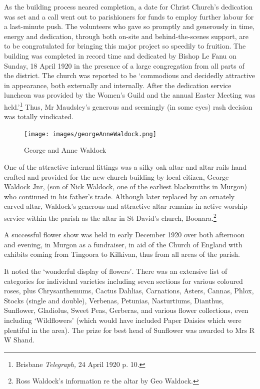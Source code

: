 As the building process neared completion, a date for Christ Church's
dedication was set and a call went out to parishioners for funds to
employ further labour for a last-minute push. The volunteers who gave so
promptly and generously in time, energy and dedication, through both
on-site and behind-the-scenes support, are to be congratulated for
bringing this major project so speedily to fruition. The building was
completed in record time and dedicated by Bishop Le Fanu on Sunday, 18
April 1920 in the presence of a large congregation from all parts of the
district. The church was reported to be `commodious and decidedly
attractive in appearance, both externally and internally. After the
dedication service luncheon was provided by the Women's Guild and the
annual Easter Meeting was held.'\footnote{Brisbane \emph{Telegraph,} 24
  April 1920 p. 10.} Thus, Mr Maudsley's generous and seemingly (in some
eyes) rash decision was totally vindicated.




\begin{figure}
\begin{center}
\texttt{[image: images/georgeAnneWaldock.png]}
\caption{George and Anne Waldock}
\end{center}
\end{figure}


One of the attractive internal fittings was a silky oak altar and altar
rails hand crafted and provided for the new church building by local
citizen, George Waldock Jnr, (son of Nick Waldock, one of the earliest
blacksmiths in Murgon) who continued in his father's trade. Although
later replaced by an ornately carved altar, Waldock's generous and
attractive altar remains in active worship service within the parish as
the altar in St David's church, Boonara.\footnote{Ross Waldock's
  information re the altar by Geo Waldock.}

A successful flower show was held in early December 1920 over both
afternoon and evening, in Murgon as a fundraiser, in aid of the Church
of England with exhibits coming from Tingoora to Kilkivan, thus from all
areas of the parish.

It noted the `wonderful display of flowers'\emph{.} There was an
extensive list of categories for individual varieties including seven
sections for various coloured roses, plus Chrysanthemums, Cactus
Dahlias, Carnations, Asters, Cannas, Phlox, Stocks (single and double),
Verbenas, Petunias, Nasturtiums, Dianthus, Sunflower, Gladiolus, Sweet
Peas, Gerberas, and various flower collections, even including
`Wildflowers' (which would have included Paper Daisies which were
plentiful in the area). The prize for best head of Sunflower was awarded
to Mrs R W Shand.

